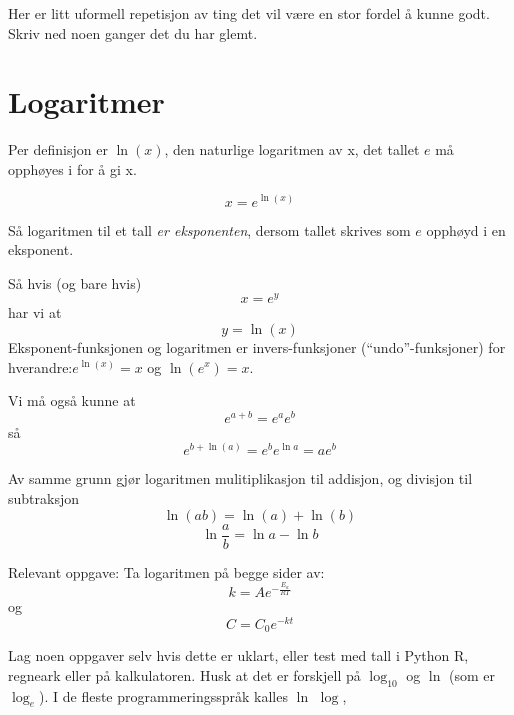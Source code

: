 \documentclass[11pt, A4paper]{article}
\begin{document}
Her er litt uformell repetisjon av ting det vil være en stor fordel å kunne godt. Skriv ned noen ganger det du har glemt.

\section{Logaritmer}

Per definisjon er $\ln(x)$, den naturlige logaritmen av x,  det tallet $e$ må opphøyes i for å gi x.

\begin{equation*}
\label{eq:6}
x = e^{\ln(x)}
\end{equation*}

Så logaritmen til et tall \textit{er eksponenten}, dersom tallet skrives som $e$ opphøyd i en eksponent.

Så hvis (og bare hvis)
\begin{equation*}
\label{eq:8}
x = e^y
\end{equation*}
har vi at
\begin{equation*}
\label{eq:9}
y = \ln(x)
\end{equation*}
Eksponent-funksjonen og logaritmen er invers-funksjoner (``undo''-funksjoner) for hverandre:\newline $e^{\ln(x)}=x$ og $\ln(e^x)=x$. 

Vi må også kunne at
\begin{equation*}
\label{eq:10}
e^{a+b} = e^ae^b
\end{equation*}
så
\begin{equation*}
\label{eq:12}
e^{b+\ln(a)} = e^b e^{\ln{a}} = ae^{b}
\end{equation*}

Av samme grunn gjør logaritmen mulitiplikasjon til addisjon, og divisjon til subtraksjon
\begin{equation*}
\label{eq:7}
\ln(a b) = \ln(a) + \ln(b)
\end{equation*}
\begin{equation*}
\label{eq:13}
\ln{\frac{a}{b}} = \ln{a}-\ln{b}
\end{equation*}

Relevant oppgave: Ta logaritmen på begge sider av:
\begin{equation*}
\label{eq:14}
k = A e^{-\frac{E_a}{RT}}
\end{equation*}
og
\begin{equation*}
\label{eq:15}
C = C_0 e^{-kt}
\end{equation*}

Lag noen oppgaver selv hvis dette er uklart, eller test med tall i Python R, regneark
eller på kalkulatoren.  Husk at det er forskjell på $\log_{10}$ og
$\ln$ (som er $\log_e$). I de fleste programmeringsspråk kalles $\ln$ $\log$,
\end{document}
